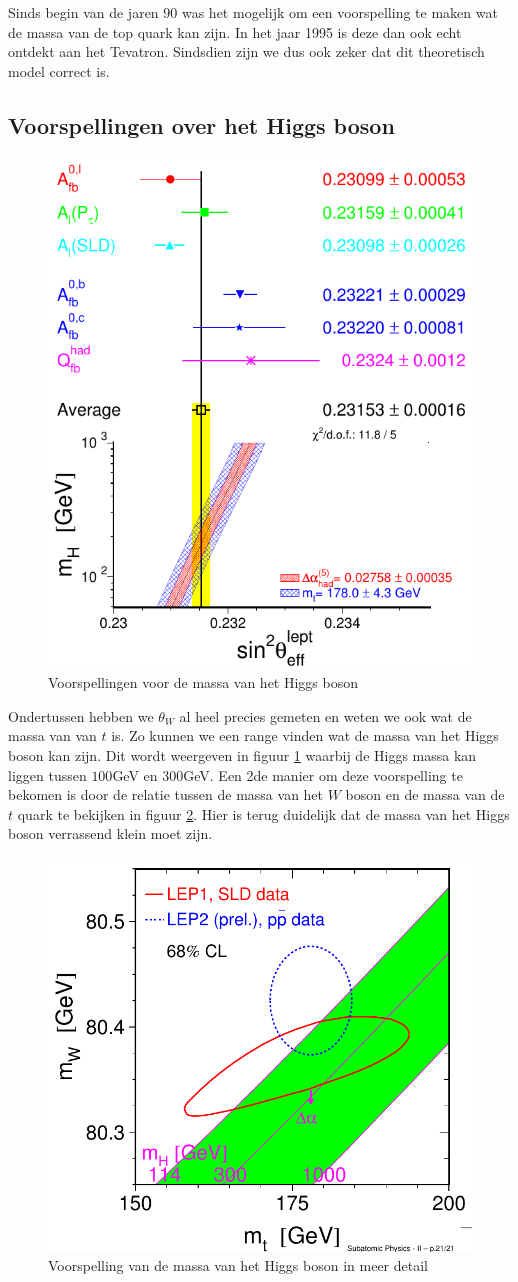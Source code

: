 \documentclass[../main.tex]{subfiles}
\begin{document}
Sinds begin van de jaren 90 was het mogelijk om een voorspelling te maken wat de massa van de top quark kan zijn. In het jaar 1995 is deze dan ook echt ontdekt aan het Tevatron. Sindsdien zijn we dus ook zeker dat dit theoretisch model correct is.

\subsection{Voorspellingen over het Higgs boson}%
\label{sub:voorspellingen_over_het_higgs_boson}

\begin{figure}[h]
    \centering
    \includegraphics[width=0.5\linewidth]{elektroweak_precision_tests/h_massa_voorspelling.png}
    \caption{Voorspellingen voor de massa van het Higgs boson}%
    \label{fig:elektroweak_precision_tests/h_massa_voorspelling}
\end{figure}
Ondertussen hebben we $\theta_W$ al heel precies gemeten en weten we ook wat de massa van van $t$ is. Zo kunnen we een range vinden wat de massa van het Higgs boson kan zijn. Dit wordt weergeven in figuur \ref{fig:elektroweak_precision_tests/h_massa_voorspelling} waarbij de Higgs massa kan liggen tussen $100$GeV en $300$GeV. Een 2de manier om deze voorspelling te bekomen is door de relatie tussen de massa van het $W$ boson en de massa van de $t$ quark te bekijken in figuur \ref{fig:elektroweak_precision_tests/h_massa_voorspelling_2}. Hier is terug duidelijk dat de massa van het Higgs boson verrassend klein moet zijn.

\begin{figure}[h]
    \centering
    \includegraphics[width=0.4\linewidth]{elektroweak_precision_tests/h_massa_voorspelling_2.png}
    \caption{Voorspelling van de massa van het Higgs boson in meer detail}%
    \label{fig:elektroweak_precision_tests/h_massa_voorspelling_2}
\end{figure}
\end{document}
